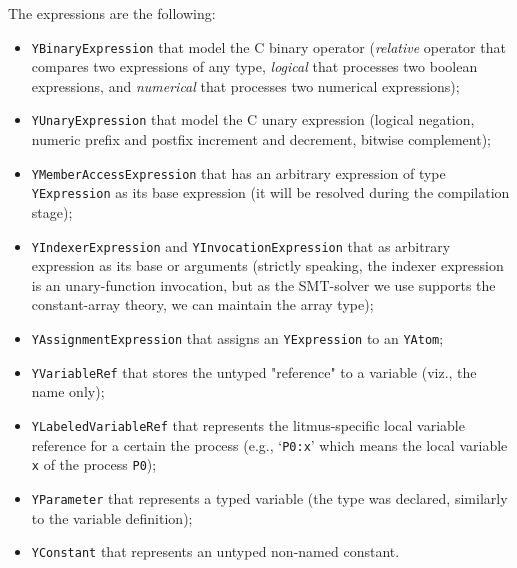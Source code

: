\vspace{1em}
The \ytree{} expressions are the following:

\begin{itemize}%
  \item \texttt{YBinaryExpression} that model the C binary operator (\textit{relative} operator that compares two expressions of any type, \textit{logical} that processes two boolean expressions, and \textit{numerical} that processes two numerical expressions);

  \item \texttt{YUnaryExpression} that model the C unary expression (logical negation, numeric prefix and postfix increment and decrement, bitwise complement);

  \item \texttt{YMemberAccessExpression} that has an arbitrary expression of type \texttt{YExpression} as its base expression (it will be resolved during the compilation stage);%

  \item \texttt{YIndexerExpression} and \texttt{YInvocationExpression} that as arbitrary expression as its base or arguments (strictly speaking, the indexer expression is an unary-function invocation, but as the SMT-solver we use supports the constant-array theory, we can maintain the array type);

  \item \texttt{YAssignmentExpression} that assigns an \texttt{YExpression} to an \texttt{YAtom};

  \item \texttt{YVariableRef} that stores the untyped "reference" to a variable (viz., the name only);

  \item \texttt{YLabeledVariableRef} that represents the litmus-specific local variable reference for a certain the process (e.g., `\lstinline{P0:x}' which means the local variable \lstinline{x} of the process \lstinline{P0});

  \item \texttt{YParameter} that represents a typed variable (the type was declared, similarly to the variable definition);

  \item \texttt{YConstant} that represents an untyped non-named constant.
\end{itemize}

